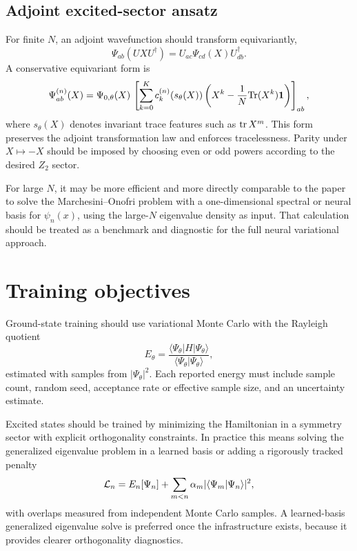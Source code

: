 \documentclass[11pt]{article}
\begin{document}
\subsection{Adjoint excited-sector ansatz}

For finite \(N\), an adjoint wavefunction should transform equivariantly,
\begin{equation}
  \Psi_{ab}(UXU^\dagger)=U_{ac}\Psi_{cd}(X)U^\dagger_{db}.
\end{equation}
A conservative equivariant form is
\begin{equation}
  \Psi^{(n)}_{ab}(X)
  =
  \Psi_{0,\theta}(X)\,
  \left[
    \sum_{k=0}^{K} c^{(n)}_k(s_\theta(X))
    \left(X^k-\frac{1}{N}{\rm Tr}(X^k)\mathbf{1}\right)
  \right]_{ab},
\end{equation}
where \(s_\theta(X)\) denotes invariant trace features such as
\({\rm tr}\,X^m\).  This form preserves the adjoint transformation law and
enforces tracelessness.  Parity under \(X\mapsto -X\) should be imposed by
choosing even or odd powers according to the desired \(Z_2\) sector.

For large \(N\), it may be more efficient and more directly comparable to the
paper to solve the Marchesini--Onofri problem with a one-dimensional spectral
or neural basis for \(\psi_n(x)\), using the large-\(N\) eigenvalue density as
input.  That calculation should be treated as a benchmark and diagnostic for
the full neural variational approach.

\section{Training objectives}

Ground-state training should use variational Monte Carlo with the Rayleigh
quotient
\begin{equation}
  E_\theta =
  \frac{\langle \Psi_\theta|H|\Psi_\theta\rangle}
       {\langle \Psi_\theta|\Psi_\theta\rangle},
\end{equation}
estimated with samples from \(|\Psi_\theta|^2\).  Each reported energy must
include sample count, random seed, acceptance rate or effective sample size,
and an uncertainty estimate.

Excited states should be trained by minimizing the Hamiltonian in a symmetry
sector with explicit orthogonality constraints.  In practice this means solving
the generalized eigenvalue problem in a learned basis or adding a rigorously
tracked penalty
\begin{equation}
  {\cal L}_n =
  E_n[\Psi_n]
  +
  \sum_{m<n}\alpha_m
  |\langle \Psi_m|\Psi_n\rangle|^2,
\end{equation}
with overlaps measured from independent Monte Carlo samples.  A learned-basis
generalized eigenvalue solve is preferred once the infrastructure exists,
because it provides clearer orthogonality diagnostics.
\end{document}
